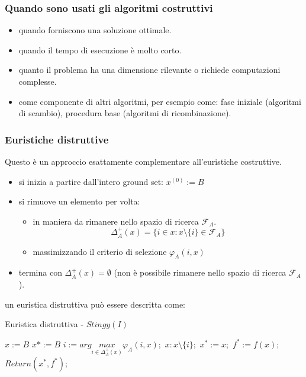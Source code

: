 \documentclass{article}
\begin{document}
    \subsubsection{Quando sono usati gli algoritmi costruttivi}
    \begin{itemize}
        \item quando forniscono una soluzione ottimale.
        \item quando il tempo di esecuzione è molto corto.
        \item quanto il problema ha una dimensione rilevante o richiede computazioni complesse.
        \item come componente di altri algoritmi, per esempio come: fase iniziale (algoritmi di scambio),
              procedura base (algoritmi di ricombinazione).
    \end{itemize}

    \subsubsection{Euristiche distruttive}
    Questo è un approccio esattamente complementare all'euristiche costruttive.
    \begin{itemize}
        \item si inizia a partire dall'intero ground set: $x^{(0)}:=B$
        \item si rimuove un elemento per volta:
              \begin{itemize}
                  \item in maniera da rimanere nello spazio di ricerca $\mathcal{F}_A$.
                        $$\Delta_A^+(x)=\{i\in x:x\setminus\{i\}\in\mathcal{F}_A\}$$
                  \item massimizzando il criterio di selezione $\varphi_A(i,x)$
              \end{itemize}
        \item termina con $\Delta_A^+(x)=\emptyset$ (non è possibile rimanere nello spazio di ricerca $\mathcal{F}_A$).
    \end{itemize}
    un euristica distruttiva può essere descritta come:

    \begin{algorithm}[H]
        \caption{Euristica distruttiva - $Stingy(I)$}
        \begin{algorithmic}
            \State $x:=B$
            \State $x*:=B$
            \Else
            \EndIf
            \State $i:=arg\underset{i \in \Delta_A^+(x)}{max}\varphi_A(i,x);$
            \State $x:x\setminus\{i\};$
            \EndWhile
            \State $x^*:=x;$
            \State $f^*:=f(x);$
            \EndIf
            \State $Return(x^*,f^*);$
        \end{algorithmic}
    \end{algorithm}
\end{document}
